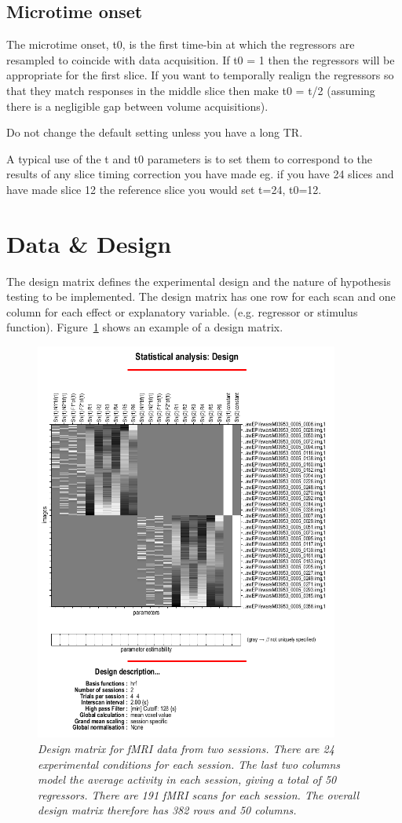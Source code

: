 \subsection{Microtime onset}
The microtime onset, t0, is the first time-bin at which the regressors are resampled to coincide with data acquisition.  If t0 = 1 then the regressors will be appropriate for the first slice.  If you want to temporally realign the regressors so that they match responses in the middle slice then make t0 = t/2 (assuming there is a negligible gap between volume acquisitions).                                           

Do not change the default setting unless you have a long TR. 

A typical use of the t and t0 parameters is to set them 
to correspond to the results of any slice timing correction you have made eg. if you have 24 slices and have made slice 12 the reference slice you would set 
t=24, t0=12. 

\section{Data \& Design}
The design matrix defines the experimental design and the nature of hypothesis testing to be implemented.  The design matrix has one row for each scan and one column for each effect or explanatory variable. (e.g. regressor or stimulus function).  Figure~\ref{design} shows an example
of a design matrix.

\begin{figure}
\includegraphics[width=100mm]{fmri_spec/design}
\caption{\em Design matrix for fMRI data from two sessions. 
There are 24 experimental conditions for each session. The last two columns 
model the average activity in each session, giving a total of 50 regressors.
There are 191 fMRI scans for each session. The overall design matrix 
therefore has 382 rows and 50 columns. \label{design}}
\end{figure}

